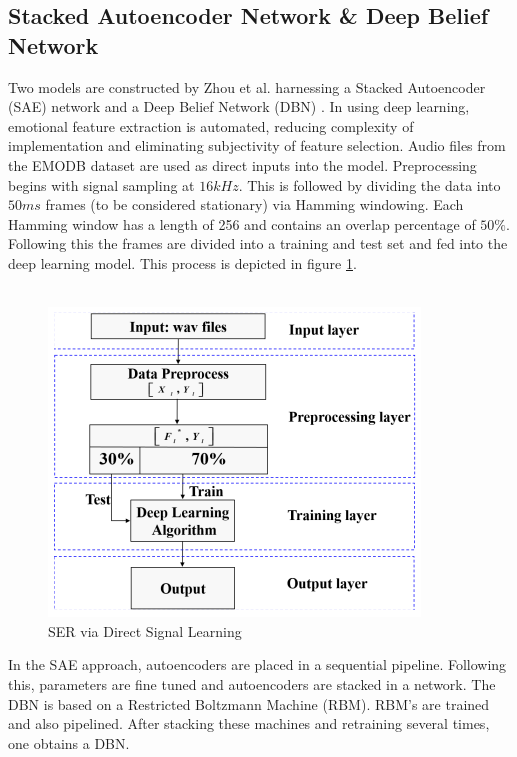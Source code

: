 \subsection{Stacked Autoencoder Network \& Deep Belief Network}
Two models are constructed by Zhou et al. harnessing a Stacked Autoencoder (SAE) network and a Deep Belief Network (DBN) \cite{zhou2016deep}. In using deep learning, emotional feature extraction is automated, reducing complexity of implementation and eliminating subjectivity of feature selection. Audio files from the EMODB dataset are used as direct inputs into the model. Preprocessing begins with signal sampling at $16kHz$. This is followed by dividing the data into $50ms$ frames (to be considered stationary) via Hamming windowing. Each Hamming window has a length of 256 and contains an overlap percentage of $50\%$. Following this the frames are divided into a training and test set and fed into the deep learning model. This process is depicted in figure \ref{zhou2016_flowchart}.\\ \\
\begin{figure}[h]
        \centering
        \includegraphics[scale = 0.8]{images/zhou_flowchart_fig.png}
        \caption{SER via Direct Signal Learning \cite{zhou2016deep}}
        \label{zhou2016_flowchart}
\end{figure}
In the SAE approach, autoencoders are placed in a sequential pipeline. Following this, parameters are fine tuned and autoencoders are stacked in a network. The DBN is based on a Restricted Boltzmann Machine (RBM). RBM's are trained and also pipelined. After stacking these machines and retraining several times, one obtains a DBN.\\ \\
